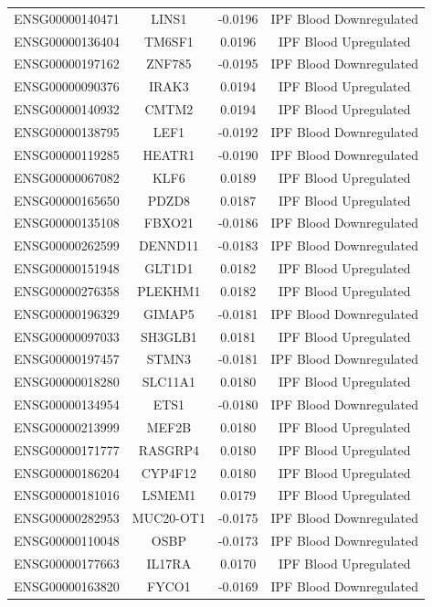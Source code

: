\documentclass[
]{article}
\begin{document}
\begin{singlespace}
\begin{longtable}[t]{lccc}
ENSG00000140471 & LINS1 & -0.0196 & IPF Blood Downregulated\\
ENSG00000136404 & TM6SF1 & 0.0196 & IPF Blood Upregulated\\
ENSG00000197162 & ZNF785 & -0.0195 & IPF Blood Downregulated\\
\addlinespace
ENSG00000090376 & IRAK3 & 0.0194 & IPF Blood Upregulated\\
ENSG00000140932 & CMTM2 & 0.0194 & IPF Blood Upregulated\\
ENSG00000138795 & LEF1 & -0.0192 & IPF Blood Downregulated\\
ENSG00000119285 & HEATR1 & -0.0190 & IPF Blood Downregulated\\
ENSG00000067082 & KLF6 & 0.0189 & IPF Blood Upregulated\\
\addlinespace
ENSG00000165650 & PDZD8 & 0.0187 & IPF Blood Upregulated\\
ENSG00000135108 & FBXO21 & -0.0186 & IPF Blood Downregulated\\
ENSG00000262599 & DENND11 & -0.0183 & IPF Blood Downregulated\\
ENSG00000151948 & GLT1D1 & 0.0182 & IPF Blood Upregulated\\
ENSG00000276358 & PLEKHM1 & 0.0182 & IPF Blood Upregulated\\
\addlinespace
ENSG00000196329 & GIMAP5 & -0.0181 & IPF Blood Downregulated\\
ENSG00000097033 & SH3GLB1 & 0.0181 & IPF Blood Upregulated\\
ENSG00000197457 & STMN3 & -0.0181 & IPF Blood Downregulated\\
ENSG00000018280 & SLC11A1 & 0.0180 & IPF Blood Upregulated\\
ENSG00000134954 & ETS1 & -0.0180 & IPF Blood Downregulated\\
\addlinespace
ENSG00000213999 & MEF2B & 0.0180 & IPF Blood Upregulated\\
ENSG00000171777 & RASGRP4 & 0.0180 & IPF Blood Upregulated\\
ENSG00000186204 & CYP4F12 & 0.0180 & IPF Blood Upregulated\\
ENSG00000181016 & LSMEM1 & 0.0179 & IPF Blood Upregulated\\
ENSG00000282953 & MUC20-OT1 & -0.0175 & IPF Blood Downregulated\\
\addlinespace
ENSG00000110048 & OSBP & -0.0173 & IPF Blood Downregulated\\
ENSG00000177663 & IL17RA & 0.0170 & IPF Blood Upregulated\\
ENSG00000163820 & FYCO1 & -0.0169 & IPF Blood Downregulated\\

\end{longtable}
\end{singlespace}
\end{document}
